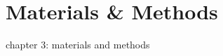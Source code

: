 \chapter[Materials \& Methods]{Materials \& Methods} \label{c:methods} \glsresetall
%
chapter 3: materials and methods
